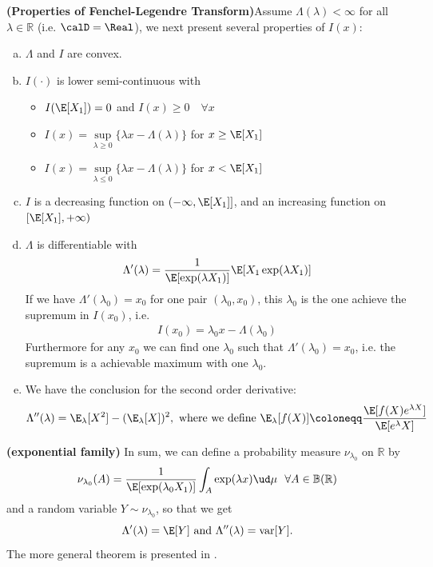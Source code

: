 \documentclass{article}
\newcommand{\bfs}[1]{\textbf{({#1})}}
\begin{document}
\begin{lema}{\bfs{Properties of Fenchel-Legendre Transform}}\label{ld:lemfen}Assume $\Lambda(\lambda) < \infty$ for all $\lambda \in \mathbb{R}$ (i.e. $\calD =\Real$), we next present several properties of $I(x)$:
\begin{enumerate}[(a)]
    \item $\Lambda$ and $I$ are convex.
    \item $I(\cdot)$ is lower semi-continuous with
        \begin{itemize}
            \item $I(\E[X_1])=0$ and $I(x) \geq 0 \quad \forall x$
            \item $I(x)=\sup\limits_{\lambda\geq0}\{\lambda x-\Lambda(\lambda)\}$ for $x \geq \E[X_1]$
			\item $I(x)=\sup\limits_{\lambda\leq0}\{\lambda x-\Lambda(\lambda)\}$ for $x < \E[X_1]$
        \end{itemize}
    \item $I$ is a decreasing function on $(-\infty, \E[X_1]]$, and an increasing function on  $[\E[X_1], +\infty)$
    
        	\item  $\Lambda$ is differentiable with
	\begin{align*}
		\Lambda'(\lambda)=\frac{1}{\E[\exp(\lambda X_1)]}\E[X_1 \exp(\lambda X_1)]
	\end{align*}
	If we have 	$\Lambda'(\lambda_0)=x_0 $ for one pair $(\lambda_0,x_0)$, this $\lambda_0$ is the one achieve the supremum in $I(x_0)$, i.e.
	\begin{align*}	
		 I(x_0)= \lambda_0 x -\Lambda(\lambda_0)
	\end{align*}
	Furthermore for any $x_0$ we can find one $\lambda_0$ such that $\Lambda'(\lambda_0)=x_0 $, i.e. the supremum is a achievable maximum with one $\lambda_0$.
	\item We have the conclusion for the second order derivative:
	\begin{align*}
		\Lambda''(\lambda)=\E_{\lambda}[X^2] - (\E_{\lambda}[X])^2, \text{ where we define } \E_{\lambda}[f(X)]\coloneqq \frac{\E[f(X)e^{\lambda X}]}{\E[e^\lambda X]}
	\end{align*}
\end{enumerate}
\begin{rema}\bfs{exponential family}
	In sum, we can define a probability measure $\nu_{\lambda_0}$ on $\mathbb{R}$ by
			\begin{align*}
			\nu_{\lambda_0}(A)=\frac{1}{\E[\exp(\lambda_0 X_1)]}\int_{A}\exp(\lambda x)\ud \mu\ \ \forall A \in\mathbb{B}(\mathbb{R})
			\end{align*}
		and a random variable $Y\sim \nu_{\lambda_0}$, so that we get
		$$	\Lambda'(\lambda) =\E [Y] \text{ and } \Lambda''(\lambda)=\mathrm{var}[Y].$$
	The more general theorem is presented in \cite[Theorem 1.6.2.]{Statistics}.
\end{rema}
\end{lema} 
\end{document}
